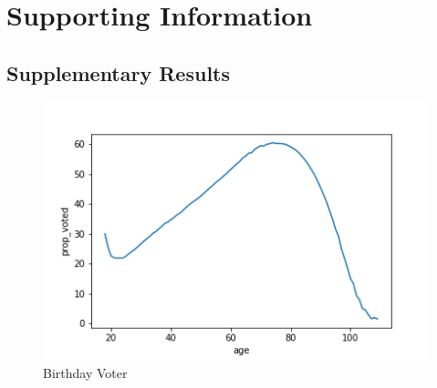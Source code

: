 \documentclass[12pt, letterpaper]{article}
\begin{document}
\clearpage

  

\clearpage
\appendix
\renewcommand{\thesection}{SI \arabic{section}}
\renewcommand\thetable{\thesection.\arabic{table}}  
\renewcommand\thefigure{\thesection.\arabic{figure}}

\section{Supporting Information}

\subsection{Supplementary Results}
\begin{figure}[H]
\centering
 \includegraphics[scale=.7]{../figs/fig3_prop_voted_by_age.png}
 \caption{Birthday Voter}
 \label{fig:birthday}
\end{figure}
\end{document}
